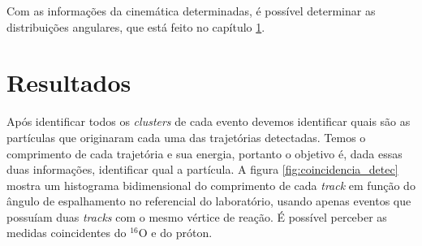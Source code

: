 \documentclass[a4paper,12pt,oneside]{book}
\begin{document}
%
%


\par Com as informações da cinemática determinadas, é possível determinar as distribuições angulares, que está feito no capítulo \ref{chapter:resultados}.

\chapter{Resultados}\label{chapter:resultados}

\par Após identificar todos os \textit{clusters} de cada evento devemos identificar quais são as partículas que originaram cada uma das trajetórias detectadas. Temos o comprimento de cada trajetória e sua energia, portanto o objetivo é, dada essas duas informações, identificar qual a partícula. A figura \ref{fig:coincidencia_detec} mostra um histograma bidimensional do comprimento de cada \textit{track} em função do ângulo de espalhamento no referencial do laboratório, usando apenas eventos que possuíam duas \textit{tracks} com o mesmo vértice de reação. É possível perceber as medidas coincidentes do $^{16}$O e do próton.
\end{document}
